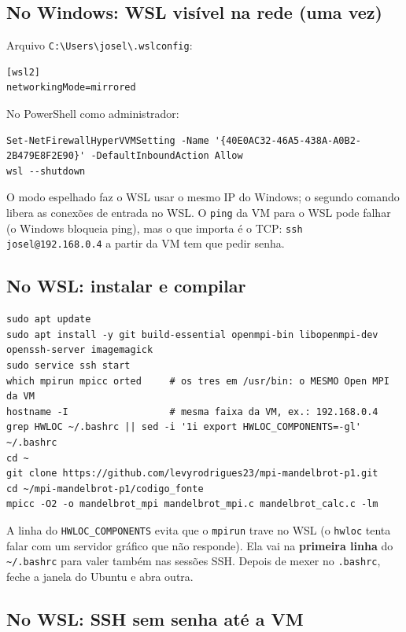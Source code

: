 \documentclass[a4paper,11pt]{article}
\begin{document}
\subsection{No Windows: WSL visível na rede (uma vez)}

Arquivo \texttt{C:\textbackslash Users\textbackslash josel\textbackslash .wslconfig}:
\begin{lstlisting}[style=sh]
[wsl2]
networkingMode=mirrored
\end{lstlisting}
No PowerShell como administrador:
\begin{lstlisting}[style=sh]
Set-NetFirewallHyperVVMSetting -Name '{40E0AC32-46A5-438A-A0B2-2B479E8F2E90}' -DefaultInboundAction Allow
wsl --shutdown
\end{lstlisting}
O modo espelhado faz o WSL usar o mesmo IP do Windows; o segundo comando libera as conexões de entrada no WSL. O \texttt{ping} da VM para o WSL pode falhar (o Windows bloqueia ping), mas o que importa é o TCP: \texttt{ssh josel@192.168.0.4} a partir da VM tem que pedir senha.

\subsection{No WSL: instalar e compilar}

\begin{lstlisting}[style=sh]
sudo apt update
sudo apt install -y git build-essential openmpi-bin libopenmpi-dev openssh-server imagemagick
sudo service ssh start
which mpirun mpicc orted     # os tres em /usr/bin: o MESMO Open MPI da VM
hostname -I                  # mesma faixa da VM, ex.: 192.168.0.4
grep HWLOC ~/.bashrc || sed -i '1i export HWLOC_COMPONENTS=-gl' ~/.bashrc
cd ~
git clone https://github.com/levyrodrigues23/mpi-mandelbrot-p1.git
cd ~/mpi-mandelbrot-p1/codigo_fonte
mpicc -O2 -o mandelbrot_mpi mandelbrot_mpi.c mandelbrot_calc.c -lm
\end{lstlisting}
A linha do \texttt{HWLOC\_COMPONENTS} evita que o \texttt{mpirun} trave no WSL (o \texttt{hwloc} tenta falar com um servidor gráfico que não responde). Ela vai na \textbf{primeira linha} do \texttt{\textasciitilde/.bashrc} para valer também nas sessões SSH. Depois de mexer no \texttt{.bashrc}, feche a janela do Ubuntu e abra outra.

\subsection{No WSL: SSH sem senha até a VM}
\end{document}
